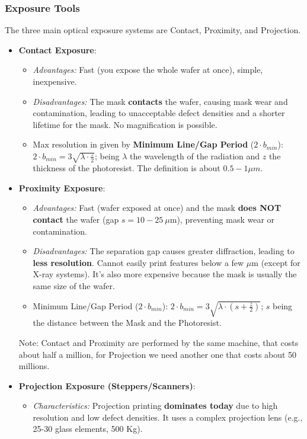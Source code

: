 \documentclass{report}
\begin{document}
\subsubsection{Exposure Tools} The three main optical exposure systems are Contact, Proximity, and Projection.
\begin{itemize} 
    \item \textbf{Contact Exposure}: 
    \begin{itemize} 
        \item \textit{Advantages:} Fast (you expose the whole wafer at once), simple, inexpensive.
        \item \textit{Disadvantages:} The mask \textbf{contacts} the wafer, causing mask wear and contamination, leading to unacceptable defect densities and a shorter lifetime for the mask. No magnification is possible. 
        \item Max resolution in given by \textbf{Minimum Line/Gap Period} ($2\cdot b_{min}$): $2\cdot b_{min}=3\sqrt{\lambda\cdot\frac{z}{2}}$; being $\lambda$ the wavelength of the radiation and $z$ the thickness of the photoresist. The definition is about $0.5-1\mu m$.
    \end{itemize} 
    \item \textbf{Proximity Exposure}: 
    \begin{itemize} 
        \item \textit{Advantages:} Fast (wafer exposed at once) and the mask \textbf{does NOT contact} the wafer (gap $s=10-25~\mu \text{m}$), preventing mask wear or contamination. 
        \item \textit{Disadvantages:} The separation gap causes greater diffraction, leading to \textbf{less resolution}. Cannot easily print features below a few $\mu \text{m}$ (except for X-ray systems). It's also more expensive because the mask is usually the same size of the wafer.
        \item Minimum Line/Gap Period ($2\cdot b_{min}$): $2\cdot b_{min}=3\sqrt{\lambda\cdot(s+\frac{z}{2})}$; $s$ being the distance between the Mask and the Photoresist.
    \end{itemize} 
    Note: Contact and Proximity are performed by the same machine, that costs about half a million, for Projection we need another one that costs about 50 millions.
    \item \textbf{Projection Exposure (Steppers/Scanners)}: 
    \begin{itemize} 
        \item \textit{Characteristics:} Projection printing \textbf{dominates today} due to high resolution and low defect densities. It uses a complex projection lens (e.g., 25-30 glass elements, 500 Kg). 

\end{itemize}
\end{itemize}
\end{document}
